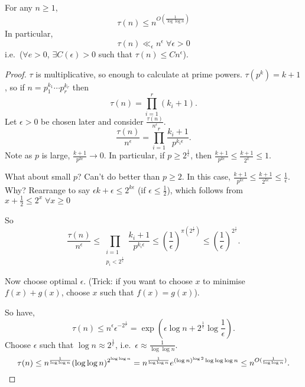 \documentclass{article}
\begin{document}
\subsection{}
\begin{thm}\label{thm:5}
  For any $n \geq 1$,
  \begin{equation*}
    \tau(n) \leq n^{O\left(\frac{1}{\log \log n}\right)}
  \end{equation*}
  In particular,
  \begin{equation*}
    \tau(n) \ll_\epsilon n^\epsilon \; \forall \epsilon > 0
  \end{equation*}
  i.e.\ ($\forall e > 0$, $\exists C(\epsilon) > 0$ such that $\tau(n) \leq C n^\epsilon$).
\end{thm}
\begin{proof}
  $\tau$ is multiplicative, so enough to calculate at prime powers. $\tau(p^k) = k+1$, so if $n = p_1^{k_1} \dotsm p_r^{k_r}$ then
  \begin{equation*}
    \tau(n) = \prod_{i=1}^r (k_i + 1).
  \end{equation*}
  Let $\epsilon > 0$ be chosen later and consider $\frac{\tau(n)}{n^\epsilon}$.
  \begin{equation*}
    \frac{\tau(n)}{n^\epsilon} = \prod_{i=1}^r \frac{k_i+1}{p^{k_i \epsilon}}.
  \end{equation*}
  Note as $p$ is large, $\frac{k+1}{p^{k\epsilon}} \to 0$. In particular, if $p \geq 2^{\frac{1}{\epsilon}}$, then $\frac{k+1}{p^{k\epsilon}} \leq \frac{k+1}{2^k} \leq 1$.

  What about small $p$? Can't do better than $p \geq 2$.
  In this case, $\frac{k+1}{p^{k\epsilon}} \leq \frac{k+1}{2^{k\epsilon}} \leq \frac{1}{\epsilon}$.
  Why? Rearrange to say $\epsilon k + \epsilon \leq 2^{k \epsilon}$ (if $\epsilon \leq \frac{1}{2}$), which follows from $x + \frac{1}{2} \leq 2^x \; \forall x \geq 0$

  So
  \begin{equation*}
    \frac{\tau(n)}{n^\epsilon} \leq \prod_{\substack{i=1 \\ p_i < 2^{\frac{1}{\epsilon}}}} \frac{k_i + 1}{p^{k_i \epsilon}} \leq \left(\frac{1}{\epsilon}\right)^{\pi(2^{\frac{1}{\epsilon}})} \leq \left(\frac{1}{\epsilon}\right)^{2^{\frac{1}{\epsilon}}}.
  \end{equation*}

  Now choose optimal $\epsilon$.
  (Trick: if you want to choose $x$ to minimise $f(x) + g(x)$, choose $x$ such that $f(x) = g(x)$).

  So have,
  \begin{equation*}
    \tau(n) \leq n^\epsilon \epsilon^{-2^{\frac{1}{\epsilon}}} = \exp\left(\epsilon \log n + 2^{\frac{1}{\epsilon}} \log \frac{1}{\epsilon}\right).
  \end{equation*}
  Choose $\epsilon$ such that $\log n \approx 2^{\frac{1}{\epsilon}}$, i.e.\ $\epsilon \approx \frac{1}{\log \log n}$.
  \begin{equation*}
    \tau(n) \leq n^{\frac{1}{\log \log n}} (\log \log n)^{2^{\log \log n}} = n^{\frac{1}{\log \log n}} e^{(\log n)^{\log 2} \log \log \log n} \leq n^{O(\frac{1}{\log \log n})}. \qedhere
  \end{equation*}
\end{proof}
\end{document}
